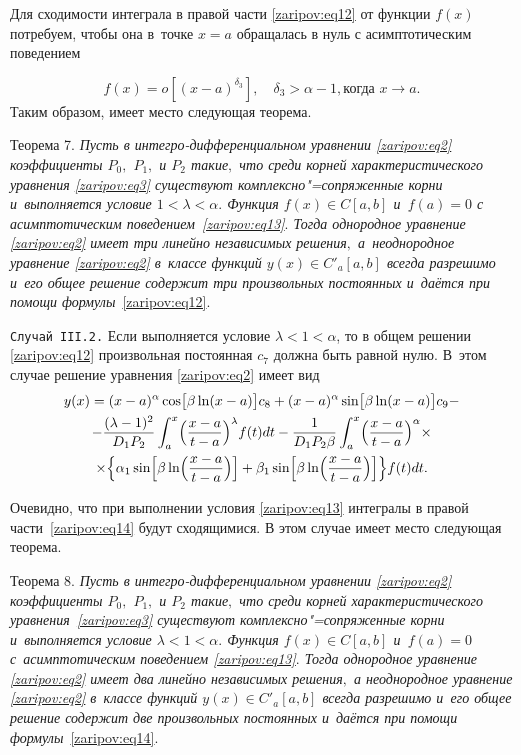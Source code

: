 Для сходимости интеграла в правой части \eqref{zaripov:eq12} от функции $f(x)$  потребуем, чтобы она в~точке $x=a$  обращалась в нуль с асимптотическим поведением
 {\begin{equation}
f(x)=o\left[\left(x-a\right)^{\delta_3}\right],\quad  \delta_3>\alpha-1, \text {когда $x\rightarrow{a}$}.\label{zaripov:eq13}
\end{equation}
Таким образом, имеет место следующая теорема.

\smallskip

{\small \sc Теорема 7.} {\it Пусть в интегро-дифференциальном уравнении \eqref{zaripov:eq2} коэффициенты $P_0,$ $P_1,$  и $P_2$  такие$,$ что среди корней характеристического уравнения \eqref{zaripov:eq3} существуют комплексно"=сопряженные корни и~выполняется условие $1<\lambda<\alpha.$ 
Функция $f(x)\in C[a,b]$   и~$f(a)=0$ с асимптотическим поведением~\eqref{zaripov:eq13}$.$
 Тогда однородное уравнение \eqref{zaripov:eq2} имеет три линейно независимых решения$,$ а~неоднородное уравнение \eqref{zaripov:eq2} в~классе функций $y(x)\in C'_a[a,b]$ всегда разрешимо и~его общее решение содержит три произвольных постоянных и~даётся при помощи формулы}~\eqref{zaripov:eq12}.

\smallskip

\texttt{Случай III.2.}  
Если выполняется условие $\lambda<1<\alpha$, то в общем решении \eqref{zaripov:eq12} произвольная постоянная $c_7$ должна быть равной нулю. В~этом случае решение уравнения \eqref{zaripov:eq2} имеет вид
\begin{multline}
y(x)=(x-a)^\alpha\cos
\bigl[\beta\ln(x-a)\bigr]c_8+(x-a)^\alpha\sin\bigl[\beta\ln(x-a)\bigr]c_9-\\
-\frac{(\lambda-1)^2}{D_1P_2}
\int _{a}^{x}\Bigl(\frac{x-a}{t-a}\Bigr)^\lambda f(t)dt-
\frac{1}{D_1P_2\beta}\int _{a}^{x}
\Bigl(\frac{x-a}{t-a}\Bigr)^\alpha\times\\
\times\Bigl\{\alpha_1\sin
\Bigl[\beta\ln\Bigl(\frac{x-a}{t-a}\Bigr)\Bigr]+
\beta_1\sin
\Bigl[\beta\ln\Bigl(\frac{x-a}{t-a}\Bigr)\Bigr]\Bigr\}f(t)dt.\label{zaripov:eq14}
\end{multline}

Очевидно, что при выполнении условия \eqref{zaripov:eq13} интегралы в правой части~\eqref{zaripov:eq14} будут сходящимися.
В этом случае имеет место следующая теорема.

\smallskip

{\small\sc Теорема 8.} {\it Пусть в интегро-дифференциальном уравнении \eqref{zaripov:eq2} коэффициенты $P_0,$ $ P_1,$  и $P_2$  такие$,$ что среди корней характеристического уравнения~\eqref{zaripov:eq3} существуют комплексно"=сопряженные корни и~выполняется условие $\lambda<1<\alpha.$ 
Функция $f(x)\in C[a,b]$   и~$f(a)=0$ с~асимптотическим поведением \eqref{zaripov:eq13}$.$
Тогда однородное уравнение \eqref{zaripov:eq2} имеет два линейно независимых решения$,$ а неоднородное уравнение \eqref{zaripov:eq2} в~классе функций $y(x)\in C'_a[a,b]$ всегда разрешимо и~его общее решение содержит две произвольных постоянных и~даётся при помощи формулы}~\eqref{zaripov:eq14}.

}
